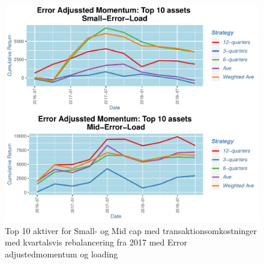 \documentclass[]{article}
\begin{document}
\begin{figure}
\centering
\includegraphics{IPA_Small_and_Mid_files/figure-latex/fig8-1.pdf}
\caption{\label{fig:Opdelt2017QErrLoad}Top 10 aktiver for Small- og Mid
cap med transaktionsomkostninger med kvartalsvis rebalancering fra 2017
med Error adjustedmomentum og loading}
\end{figure}
\end{document}
